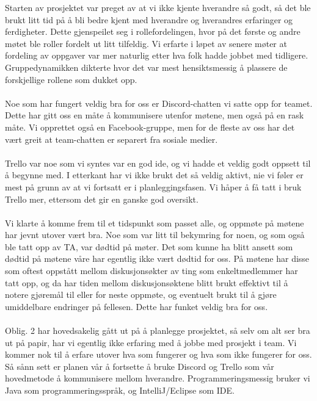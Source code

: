 \documentclass{article}
\begin{document}
\maketitle
Starten av prosjektet var preget av at vi ikke kjente hverandre så godt, så det ble brukt litt tid på 
å bli bedre kjent med hverandre og hverandres erfaringer og ferdigheter. Dette gjenspeilet seg i rollefordelingen, hvor på det første og andre møtet ble roller fordelt ut litt tilfeldig. Vi erfarte i løpet av senere møter at fordeling av oppgaver var mer naturlig etter hva folk hadde jobbet med tidligere. Gruppedynamikken dikterte hvor det var mest hensiktsmessig å plassere de forskjellige rollene som dukket opp.\\\\
Noe som har fungert veldig bra for oss er Discord-chatten vi satte opp for teamet. Dette har gitt oss en måte å kommunisere utenfor møtene, men også på en rask måte. Vi opprettet også en Facebook-gruppe, men for de fleste av oss har det vært greit at team-chatten er separert fra sosiale medier.\\\\
Trello var noe som vi syntes var en god ide, og vi hadde et veldig godt oppsett til å begynne med. I etterkant har vi ikke brukt det så veldig aktivt, nie vi føler er mest på grunn av at vi fortsatt er i planleggingsfasen. Vi håper å få tatt i bruk Trello mer, ettersom det gir en ganske god oversikt.\\\\
Vi klarte å komme frem til et tidspunkt som passet alle, og oppmøte på møtene har jevnt utover vært bra. Noe som var litt til bekymring for noen, og som også ble tatt opp av TA, var dødtid på møter. Det som kunne ha blitt ansett som dødtid på møtene våre har egentlig ikke vært dødtid for oss. På møtene har disse som oftest oppstått mellom diskusjonsøkter av ting som enkeltmedlemmer har tatt opp, og da har tiden mellom diskusjonsøktene blitt brukt effektivt til å notere gjøremål til eller for neste oppmøte, og eventuelt brukt til å gjøre umiddelbare endringer på fellesen. Dette har funket veldig bra for oss.\\\\
Oblig. 2 har hovedsakelig gått ut på å planlegge prosjektet, så selv om alt ser bra ut på papir, har vi egentlig ikke erfaring med å jobbe med prosjekt i team. Vi kommer nok til å erfare utover hva som fungerer og hva som ikke fungerer for oss. Så sånn sett er planen vår å fortsette å bruke Discord og Trello som vår hovedmetode å kommunisere mellom hverandre. Programmeringsmessig bruker vi Java som programmeringsspråk, og IntelliJ/Eclipse som IDE.
\end{document}
